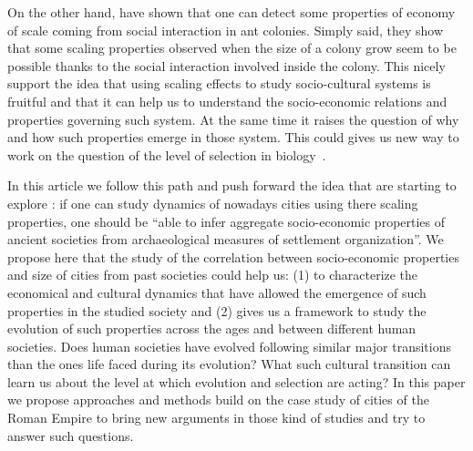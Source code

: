 \documentclass[a4paper,11pt]{article}
\begin{document}
On the other hand, \cite{hou2010energeticbasisofcoloniallivinginsocialinsects} have shown that one can detect some properties of economy of scale coming from social interaction in ant colonies. Simply said, they show that some scaling properties observed when the size of a colony grow seem to be possible thanks to the social interaction involved inside the colony. This nicely support the idea that using scaling effects to study socio-cultural systems is fruitful and that it can help us to understand the socio-economic relations and properties governing such system. At the same time it raises the question of why and how such properties emerge in those system. This could gives us new way to work on the question of the level of selection in biology~\citep{okasha2006evolution}.


In this article we follow this path and push forward the idea that \cite{ortman2014theprehistoryofurbanscaling} are starting to explore : if one can study dynamics of nowadays cities using there scaling properties, one should be ``able to infer aggregate socio-economic properties of ancient societies from archaeological measures of settlement organization''. We propose here that the study of the correlation between socio-economic properties and size of cities from past societies could help us: (1) to characterize the economical and cultural dynamics that have allowed the emergence of such properties in the studied society and (2) gives us a framework to study the evolution of such properties across the ages and between different human societies. Does human societies have evolved following similar major transitions than the ones life faced during its evolution? What such cultural transition can learn us about the level at which evolution and selection are acting?  In this paper we propose approaches and methods build on the case study of cities of the Roman Empire to bring new arguments in those kind of studies and try to answer such questions.




\end{document}
